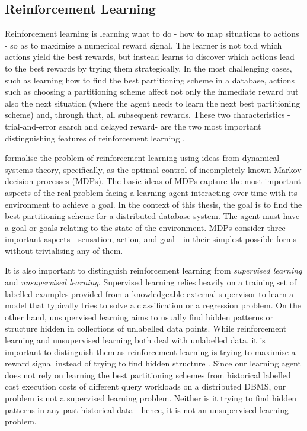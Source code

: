 \subsection{Reinforcement Learning}
Reinforcement learning is learning what to do - how to map situations to actions - so as to maximise a numerical reward signal. The learner is not told which actions yield the best rewards, but instead learns to discover which actions lead to the best rewards by trying them strategically. In the most challenging cases, such as learning how to find the best partitioning scheme in a database, actions such as choosing a partitioning scheme affect not only the immediate reward but also the next situation (where the agent needs to learn the next best partitioning scheme) and, through that, all subsequent rewards. These two characteristics - trial-and-error search and delayed reward- are the two most important distinguishing features of reinforcement learning \cite{sutton2018reinforcement}.

\citeauthor{sutton2018reinforcement} formalise the problem of reinforcement learning using ideas from dynamical systems theory, specifically, as the optimal control of incompletely-known Markov decision processes (MDPs). The basic ideas of MDPs capture the most important aspects of the real problem facing a learning agent interacting over time with its environment to achieve a goal. In the context of this thesis, the goal is to find the best partitioning scheme for a distributed database system. The agent must have a goal or goals relating to the state of the environment. MDPs consider three important aspects - sensation, action, and goal - in their simplest possible forms without trivialising any of them. 

It is also important to distinguish reinforcement learning from \textit{supervised learning} and \textit{unsupervised learning}. Supervised learning relies heavily on a training set of labelled examples provided from a knowledgeable external supervisor to learn a model that typically tries to solve a classification or a regression problem. On the other hand, unsupervised learning aims to usually find hidden patterns or structure hidden in collections of unlabelled data points. While reinforcement learning and unsupervised learning both deal with unlabelled data, it is important to distinguish them as reinforcement learning is trying to maximise a reward signal instead of trying to find hidden structure \cite{sutton2018reinforcement}. Since our learning agent does not rely on learning the best partitioning schemes from historical labelled cost execution costs of different query workloads on a distributed DBMS, our problem is not a supervised learning problem. Neither is it trying to find hidden patterns in any past historical data - hence, it is not an unsupervised learning problem.


